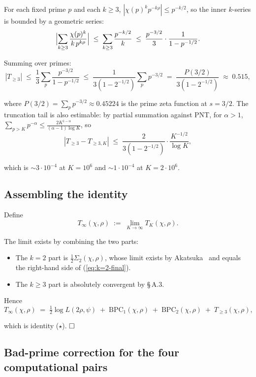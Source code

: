 For each fixed prime \(p\) and each \(k \ge 3\),
\(|\chi(p)^k p^{-k\rho}| \le p^{-k/2}\), so the inner \(k\)-series is
bounded by a geometric series:
\[
\Bigl|\sum_{k \ge 3} \frac{\chi(p)^k}{k\,p^{k\rho}}\Bigr|
\;\le\;
\sum_{k \ge 3} \frac{p^{-k/2}}{k}
\;\le\;
\frac{p^{-3/2}}{3} \cdot \frac{1}{1 - p^{-1/2}}.
\]

Summing over primes:
\[
|T_{\ge 3}|
\;\le\;
\frac{1}{3} \sum_p \frac{p^{-3/2}}{1 - p^{-1/2}}
\;\le\;
\frac{1}{3(1 - 2^{-1/2})} \sum_p p^{-3/2}
\;=\;
\frac{P(3/2)}{3(1 - 2^{-1/2})}
\;\approx\;
0.515,
\]

where \(P(3/2) = \sum_p p^{-3/2} \approx 0.45224\) is the prime zeta
function at \(s = 3/2\). The truncation tail is also estimable: by
partial summation against PNT, for \(\alpha > 1\),
\(\sum_{p > K} p^{-\alpha} \le \frac{2K^{1-\alpha}}{(\alpha-1)\log K}\),
so
\[
|T_{\ge 3} - T_{\ge 3, K}|
\;\le\;
\frac{2}{3(1 - 2^{-1/2})} \cdot \frac{K^{-1/2}}{\log K},
\]

which is \(\sim 3 \cdot 10^{-4}\) at \(K = 10^6\) and \(\sim 1 \cdot 10^{-4}\)
at \(K = 2 \cdot 10^6\).

\subsection{Assembling the identity}

Define
\[
T_\infty(\chi,\rho) \;:=\; \lim_{K \to \infty} T_K(\chi,\rho).
\]

The limit exists by combining the two parts:

\begin{itemize}
\item
  The \(k = 2\) part is \(\tfrac12 \Sigma_2(\chi, \rho)\), whose limit
  exists by Akatsuka~\cite[Lemma~2.1 \& eq.~(2.5)]{AkatsukaH2013EulerProduct} and equals the
  right-hand side of (\ref{eq:k=2-final}).
\item
  The \(k \ge 3\) part is absolutely convergent by \S\,A.3.
\end{itemize}

Hence
\[
T_\infty(\chi, \rho)
\;=\;
\tfrac12 \log L(2\rho, \psi)
\;+\; \mathrm{BPC}_1(\chi, \rho)
\;+\; \mathrm{BPC}_2(\chi, \rho)
\;+\; T_{\ge 3}(\chi, \rho),
\]

which is identity (\(\star\)). \(\hfill\square\)

\subsection{Bad-prime correction for the four computational pairs}

